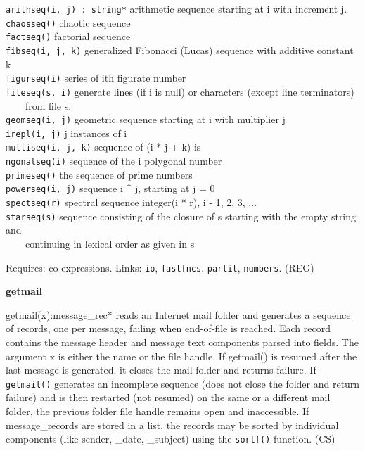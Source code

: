 \texttt{arithseq(i, j) : string*} arithmetic sequence starting at i with
increment j.\\
\texttt{chaosseq()} chaotic sequence\\
\texttt{factseq()} factorial sequence\\
\texttt{fibseq(i, j, k)} generalized Fibonacci (Lucas) sequence with
additive constant k\\
\texttt{figurseq(i)} series of i{\textquotesingle}th figurate
number\\
\texttt{fileseq(s, i)} generate lines (if i is null) or characters
(except line terminators)\\
 \ \ \ \ from file s.\\
\texttt{geomseq(i, j)} geometric sequence starting at i with multiplier
j\\
\texttt{irepl(i, j)} j instances of i\\
\texttt{multiseq(i, j, k)} sequence of (i * j + k)
i{\textquotesingle}s\\
\texttt{ngonalseq(i)} sequence of the i polygonal number\\
\texttt{primeseq()} the sequence of prime numbers\\
\texttt{powerseq(i, j)} sequence i \^{} j, starting at j = 0\\
\texttt{spectseq(r)} spectral sequence integer(i * r), i - 1, 2, 3,
...\\
\texttt{starseq(s)} sequence consisting of the closure of s starting
with the empty string and\\
 \ \ \ \ continuing in lexical order as given in s

Requires: co-expressions. Links: \texttt{io}, \texttt{fastfncs},
\texttt{partit}, \texttt{numbers}. (REG)

{\sffamily\bfseries
getmail}

\textsf{getmail(x):message\_rec*} reads an Internet mail folder and generates a sequence of records, one per message,
failing when end-of-file is reached. Each record contains the message
header and message text components parsed into fields. The argument x
is either the name or the file handle. If getmail() is resumed after
the last message is generated, it closes the mail folder and returns
failure. If \texttt{getmail()} generates an incomplete sequence (does
not close the folder and return failure) and is then restarted (not
resumed) on the same or a different mail folder, the previous folder
file handle remains open and inaccessible. If message\_records are
stored in a list, the records may be sorted by individual components
(like sender, \_date, \_subject) using the \texttt{sortf()} function.
(CS)

